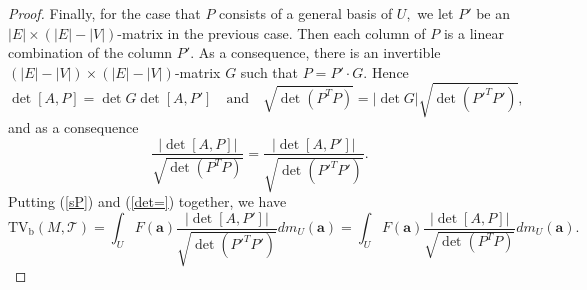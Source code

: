 \documentclass[11pt]{article}
\theoremstyle{remark}
\theoremstyle{remark}
\numberwithin{equation}{section}
\begin{document}
\begin{proof}
Finally, for the case that $P$ consists of a general basis of $U,$ we let $P'$ be an $|E|\times (|E|-|V|)$-matrix in the previous case. Then each column of $P$ is a linear combination of the column $P'.$ As a consequence, there is an invertible $(|E|-|V|)\times (|E|-|V|)$-matrix $G$ such that $P = P'\cdot G.$ Hence 
$$\det[A,P]=\det G\det[A,P']\quad\text{and}\quad \sqrt{\det(P^TP)}=\big|\det G\big|\sqrt{\det(P'^T P')},$$
and as a consequence
\begin{equation}\label{det=}
\frac{\big|\det[A,P]\big|}{\sqrt{\det(P^TP)}}=\frac{\big|\det[A,P']\big|}{\sqrt{\det(P'^TP')}}.
\end{equation}
Putting (\ref{sP}) and (\ref{det=}) together, we have 
$$   \mathrm{TV_b}(M,\mathcal T)= \int_U F( \boldsymbol a)\frac{\big|\det[A,P']\big|}{\sqrt{\det(P'^TP')}}dm_U(\boldsymbol a)= \int_U F( \boldsymbol a)\frac{\big|\det[A,P]\big|}{\sqrt{\det(P^TP)}}dm_U(\boldsymbol a).$$
\end{proof}
\end{document}
